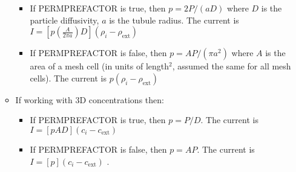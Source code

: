 \documentclass[12pt]{article}
\begin{document}
\begin{itemize}
\begin{itemize}
	\begin{itemize}
	\item If PERMPREFACTOR is true, then $p = 2P/(aD)$ where $D$ is the particle diffusivity, $a$ is the tubule radius. The current is $I = [p (\frac{A}{2\pi a}) D](\rho_i - \rho_\text{ext})$ 
	\item If PERMPREFACTOR is false, then $p = A P/(\pi a^2)$ where $A$ is the area of a mesh cell (in units of length$^2$, assumed the same for all mesh cells). The current is $p(\rho_i - \rho_\text{ext})$
	\end{itemize}
	\item If working with 3D concentrations then:
	\begin{itemize}
		\item If PERMPREFACTOR is true, then $p = P/D$. The current is $I = [p A D](c_i - c_\text{ext})$ 
		\item If PERMPREFACTOR is false, then $p = A P$. The current is $I = [p](c_i - c_\text{ext})$  .		
	\end{itemize}
	
\end{itemize}


\end{itemize}
\end{document}
